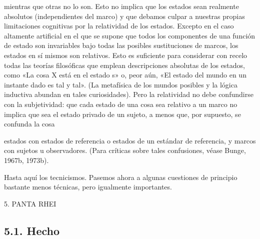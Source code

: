 \begin{justifying}
\begin{justifying}
mientras que otras no lo son. Esto no implica que los estados sean realmente absolutos
(independientes del marco) y que debamos culpar a nuestras propias limitaciones cognitivas
por la relatividad de los estados. Excepto en el caso altamente artificial
en el que se supone que todos los componentes de una función de estado son invariables
bajo todas las posibles sustituciones de marcos, los estados en sí mismos son relativos.
Esto es suficiente para considerar con recelo todas las teorías filosóficas
que emplean descripciones absolutas de los estados, como «La cosa X está en el estado s»
o, peor aún, «El estado del mundo en un instante dado es tal y tal».
(La metafísica de los mundos posibles y la lógica inductiva abundan en tales
curiosidades). Pero la relatividad no debe confundirse con la subjetividad: que
cada estado de una cosa sea relativo a un marco no implica que sea el
estado privado de un sujeto, a menos que, por supuesto, se confunda la cosa

 
    \noindent
    estados con estados de referencia o estados de un estándar de referencia, y
marcos con sujetos u observadores. (Para críticas sobre tales confusiones, véase
Bunge, 1967b, 1973b).

Hasta aquí los tecnicismos. Pasemos ahora a algunas cuestiones de principio bastante menos técnicas,
pero igualmente importantes.
\bigskip
\begin{center}
    \normalsize 5. PANTA RHEI
    \vspace{0.5cm}
   \end{center}
   \subsection{5.1. Hecho}
   

\end{justifying}
\end{justifying}
